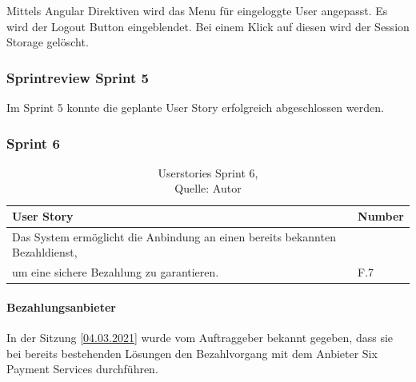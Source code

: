  Mittels Angular Direktiven wird das Menu für eingeloggte User angepasst. Es wird der Logout Button eingeblendet. Bei einem Klick auf diesen wird der Session Storage gelöscht. 
 
\subsubsection{Sprintreview Sprint 5}
 Im Sprint 5 konnte die geplante User Story erfolgreich abgeschlossen werden.
 
 
\subsubsection{Sprint 6}
\begin{table}[H]
	\begin{tabularx}{\textwidth}{|l|X|}
		\hline
		\textbf{User Story} & \textbf{Number} \\
		\hline
		Das System ermöglicht die Anbindung an einen bereits bekannten Bezahldienst, \\
		um eine sichere Bezahlung zu garantieren.& F.7\\
		\hline
	\end{tabularx} 
	\caption[Userstories Sprint 6]{Userstories Sprint 6,\\ Quelle: Autor}
\end{table}\label{userStoriesSprint6}
\paragraph{Bezahlungsanbieter}
In der Sitzung \ref{04.03.2021} wurde vom Auftraggeber bekannt gegeben, dass sie bei bereits bestehenden Lösungen den Bezahlvorgang mit dem Anbieter Six Payment Services durchführen. 

